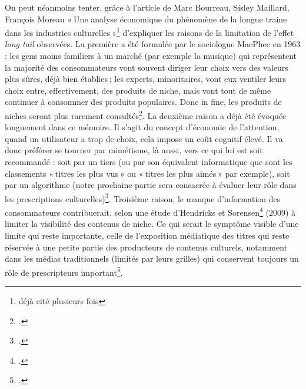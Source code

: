 On peut néanmoins tenter, grâce à l’article de Marc Bourreau, Sisley Maillard, François Moreau « Une analyse économique du phénomène de la longue traine dans les industries culturelles »\footnote{déjà cité plusieurs fois} d’expliquer les raisons de la limitation de l’effet \textit{long tail} observées. La première a été formulée par le sociologue MacPhee en 1963 : les gens moins familiers à un marché (par exemple la musique) qui représentent la majorité des consommateurs vont souvent diriger leur choix vers des valeurs plus sûres, déjà bien établies ; les experts, minoritaires, vont eux ventiler leurs choix entre, effectivement, des produits de niche, mais vont tout de même continuer à consommer des produits populaires. Donc in fine, les produits de niches seront plus rarement consultés\footcite[§ 29]{bourreau2015a}. La deuxième raison a déjà été évoquée longuement dans ce mémoire. Il s’agit du concept d’économie de l’attention, quand un utilisateur a trop de choix, cela impose un coût cognitif élevé. Il va donc préférer se tourner par mimétisme, là aussi, vers ce qui lui est soit recommandé : soit par un tiers (ou par son équivalent informatique que sont les classements « titres les plus vus » ou « titres les plus aimés » par exemple), soit par un algorithme (notre prochaine partie sera consacrée à évaluer leur rôle dans les prescriptions culturelles)\footcite[§ 39]{bourreau2015a}. Troisième raison, le manque d’information des consommateurs contribuerait, selon une étude d’Hendricks et Sorensen\footcite[§ 40]{bourreau2015a} (2009) à limiter la visibilité des contenus de niche. Ce qui serait le symptôme visible d’une limite qui reste importante, celle de l’exposition médiatique des titres qui reste réservée à une petite partie des producteurs de contenus culturels, notamment dans les médias traditionnels (limités par leurs grilles) qui conservent toujours un rôle de prescripteurs important\footcite[§ 41]{bourreau2015a}.


